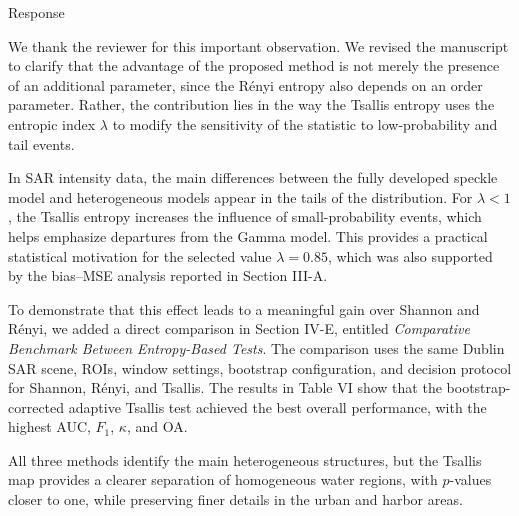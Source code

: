 \documentclass[11pt]{report}
\begin{document}
\begin{responsebox}{Response}

We thank the reviewer for this important observation. We revised the manuscript to clarify that the advantage of the proposed method is not merely the presence of an additional parameter, since the Rényi entropy also depends on an order parameter. Rather, the contribution lies in the way the Tsallis entropy uses the entropic index $\lambda$ to modify the sensitivity of the statistic to low-probability and tail events.

In SAR intensity data, the main differences between the fully developed speckle model and heterogeneous models appear in the tails of the distribution. For $\lambda<1$, the Tsallis entropy increases the influence of small-probability events, which helps emphasize departures from the Gamma model. This provides a practical statistical motivation for the selected value $\lambda=0.85$, which was also supported by the bias--MSE analysis reported in Section III-A.

\end{responsebox}

\begin{responsebox}{}

To demonstrate that this effect leads to a meaningful gain over Shannon and Rényi, we added a direct comparison in Section IV-E, entitled \emph{Comparative Benchmark Between Entropy-Based Tests}. The comparison uses the same Dublin SAR scene, ROIs, window settings, bootstrap configuration, and decision protocol for Shannon, Rényi, and Tsallis. The results in Table VI show that the bootstrap-corrected adaptive Tsallis test achieved the best overall performance, with the highest AUC, $F_1$, $\kappa$, and OA.

All three methods identify the main heterogeneous structures, but the Tsallis map provides a clearer separation of homogeneous water regions, with $p$-values closer to one, while preserving finer details in the urban and harbor areas.

\end{responsebox}

\vspace{1em}
\end{document}
